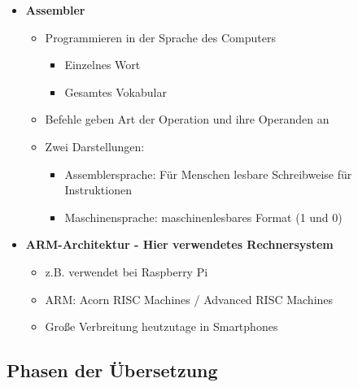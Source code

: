 \begin{itemize}
        \item \textbf{Assembler}
            \begin{itemize}
                \item Programmieren in der Sprache des Computers
                    \begin{itemize}
                        \item {} Einzelnes Wort
                        \item {} Gesamtes Vokabular
                    \end{itemize}
                \item Befehle geben Art der Operation und ihre Operanden an 
                \item Zwei Darstellungen:
                    \begin{itemize}
                        \item Assemblersprache: Für Menschen lesbare Schreibweise für Instruktionen
                        \item Maschinensprache: maschinenlesbares Format (1 und 0)
                    \end{itemize}
            \end{itemize}
        
        \item \textbf{ARM-Architektur - Hier verwendetes Rechnersystem}
            \begin{itemize}
                \item z.B. verwendet bei Raspberry Pi 
                \item ARM: Acorn RISC Machines / Advanced RISC Machines 
                \item Große Verbreitung heutzutage in Smartphones
            \end{itemize}

    \end{itemize}

\pagebreak

\subsection{Phasen der Übersetzung}

